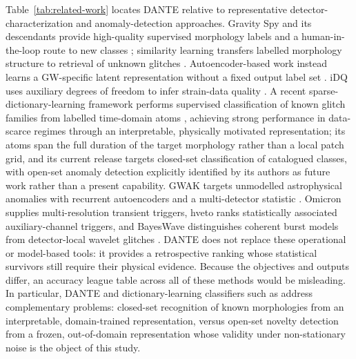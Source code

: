 \documentclass[12pt]{article}
\begin{document}
Table~\ref{tab:related-work} locates DANTE relative to representative
detector-characterization and anomaly-detection approaches.  Gravity Spy and
its descendants provide high-quality supervised morphology labels and a
human-in-the-loop route to new classes \cite{zevin2017,bahaadini2018,glanzer2023};
similarity learning transfers labelled morphology structure to retrieval of
unknown glitches \cite{coughlin2019}.  Autoencoder-based work instead learns a
GW-specific latent representation without a fixed output label set
\cite{sakai2022,laguarta2023}.  iDQ uses auxiliary degrees of freedom to infer
strain-data quality \cite{essick2020}. A recent sparse-dictionary-learning
framework performs supervised classification of known glitch families from
labelled time-domain atoms \cite{clawdia2025}, achieving strong performance in
data-scarce regimes through an interpretable, physically motivated
representation; its atoms span the full duration of the target morphology
rather than a local patch grid, and its current release targets closed-set
classification of catalogued classes, with open-set anomaly detection explicitly
identified by its authors as future work rather than a present capability. GWAK
targets unmodelled astrophysical anomalies with recurrent autoencoders and a
multi-detector statistic \cite{raikman2023}.  Omicron supplies multi-resolution transient
triggers, hveto ranks statistically associated auxiliary-channel triggers, and
BayesWave distinguishes coherent burst models from detector-local wavelet
glitches \cite{robinet2020,smith2011,cornish2015}.  DANTE does not replace
these operational or model-based tools: it provides a retrospective ranking
whose statistical survivors still require their physical evidence.  Because
the objectives and outputs differ, an accuracy league table across all of
these methods would be misleading. In particular, DANTE and dictionary-learning
classifiers such as \cite{clawdia2025} address complementary problems: closed-set
recognition of known morphologies from an interpretable, domain-trained
representation, versus open-set novelty detection from a frozen, out-of-domain
representation whose validity under non-stationary noise is the object of this
study.
\end{document}
